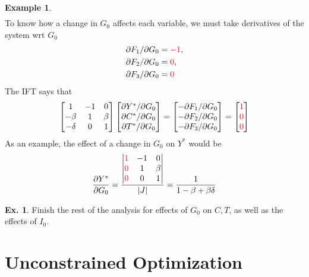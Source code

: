 \documentclass[10pt,a4paper]{book}
\newcommand{\red}[1]{\textcolor{red}{#1}}
\theoremstyle{definition}\newtheorem{definition}{Definition}
\theoremstyle{definition}\newtheorem{fact}{Fact}
\theoremstyle{definition}\newtheorem{ex}{Ex.}
\theoremstyle{definition}\newtheorem{project}{Project}
\theoremstyle{definition}\newtheorem{problem}{Problem}
\theoremstyle{definition}\newtheorem{example}{Example}
\numberwithin{theorem}{chapter}
\numberwithin{corollary}{chapter}
\numberwithin{assumption}{chapter}
\numberwithin{definition}{chapter}
\numberwithin{prop}{chapter}
\numberwithin{notation}{chapter}
\numberwithin{problem}{chapter}
\numberwithin{example}{chapter}
\numberwithin{fact}{chapter}
\numberwithin{ex}{chapter}
\begin{document}
\begin{example}
\begin{align*}
		\end{align*}
		To know how a change in $G_0$ affects each variable, we must take derivatives of the system wrt $G_0$
		\begin{align*}
			&\partial F_1/\partial G_0 = \red{-1}, \\
			&\partial F_2/\partial G_0 = \red{0}, \\
			&\partial F_3/\partial G_0 = \red{0}
		\end{align*}
		The IFT says that
		\begin{align*}
			\begin{bmatrix}
				1 & -1 & 0 \\
				-\beta & 1 & \beta \\
				-\delta & 0 & 1
			\end{bmatrix}
			\begin{bmatrix}
				\partial Y^*/\partial G_0 \\
				\partial C^*/\partial G_0 \\
				\partial T^*/\partial G_0
			\end{bmatrix}
			= \begin{bmatrix}
				- \partial F_1/\partial G_0 \\
				- \partial F_2/\partial G_0 \\
				- \partial F_3/\partial G_0
			\end{bmatrix}
			= \begin{bmatrix}
				\red{1} \\
				\red{0}\\
				\red{0}
			\end{bmatrix}
		\end{align*}
		As an example, the effect of a change in $G_0$ on $Y^*$ would be
		\begin{align*}
			\frac{\partial Y^*}{\partial G_0} = \frac{\begin{vmatrix}
				\red{1} & -1 & 0 \\
				\red{0} & 1 & \beta \\
				\red{0} & 0 & 1
			\end{vmatrix}}{|J|} = \frac{1}{1-\beta+\beta\delta}
		\end{align*}
	\end{example}
	
	\begin{ex}
		Finish the rest of the analysis for effects of $G_0$ on $C,T$, as well as the effects of $I_0$.
	\end{ex}
	
	
	\chapter{Unconstrained Optimization}
	
\end{document}
